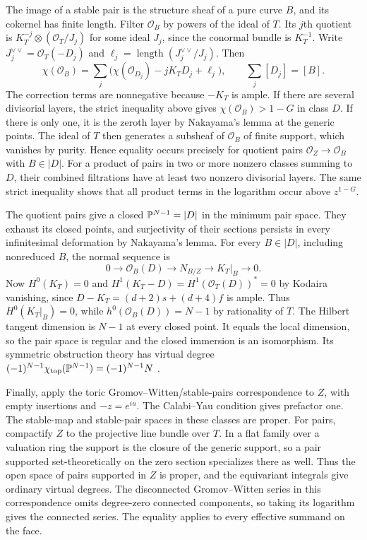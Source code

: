 The image of a stable pair is the structure sheaf of a pure curve $B$,
and its cokernel has finite length. Filter $\mathcal O_B$ by powers of
the ideal of $T$. Its $j$th quotient is
$K_T^{-j}\otimes(\mathcal O_T/J_j)$ for some ideal $J_j$, since the
conormal bundle is $K_T^{-1}$. Write
$J_j^{\vee\vee}=\mathcal O_T(-D_j)$ and
$\ell_j=\operatorname{length}(J_j^{\vee\vee}/J_j)$. Then
\[
 \chi(\mathcal O_B)=
 \sum_j\bigl(\chi(\mathcal O_{D_j})-jK_TD_j+\ell_j\bigr),
 \qquad \sum_j[D_j]=[B].
\]
The correction terms are nonnegative because $-K_T$ is ample. If there
are several divisorial layers, the strict inequality above gives
$\chi(\mathcal O_B)>1-G$ in class $D$. If there is only one, it is the
zeroth layer by Nakayama's lemma at the generic points. The ideal of
$T$ then generates a subsheaf of $\mathcal O_B$ of finite support, which
vanishes by purity. Hence equality occurs precisely for quotient pairs
$\mathcal O_Z\to\mathcal O_B$ with $B\in|D|$. For a product of pairs
in two or more nonzero classes summing to $D$, their combined filtrations
have at least two nonzero divisorial layers. The same strict inequality
shows that all product terms in the logarithm occur above $z^{1-G}$.

The quotient pairs give a closed $\mathbb P^{N-1}=|D|$ in the minimum
pair space. They exhaust its closed points, and surjectivity of their
sections persists in every infinitesimal deformation by Nakayama's lemma.
For every $B\in|D|$, including nonreduced $B$, the normal sequence is
\[
 0\longrightarrow\mathcal O_B(D)\longrightarrow N_{B/Z}
   \longrightarrow K_T|_B\longrightarrow0.
\]
Now $H^0(K_T)=0$ and $H^1(K_T-D)=H^1(\mathcal O_T(D))^*=0$ by Kodaira
vanishing, since $D-K_T=(d+2)s+(d+4)f$ is ample.
Thus $H^0(K_T|_B)=0$, while $h^0(\mathcal O_B(D))=N-1$ by rationality
of $T$. The Hilbert tangent dimension is $N-1$ at every closed point.
It equals the local dimension, so the pair space is regular and the closed
immersion is an isomorphism. Its symmetric obstruction theory has virtual
degree $(-1)^{N-1}\chi_{\rm top}(\mathbb P^{N-1})=(-1)^{N-1}N$
\cite[\S1]{pt}.

Finally, apply the toric Gromov--Witten/stable-pairs correspondence
\cite[Theorem~1]{pp} to $Z$, with empty insertions and $-z=e^{iu}$.
The Calabi--Yau condition gives prefactor one. The stable-map and
stable-pair spaces in these classes are proper. For pairs, compactify $Z$
to the projective line bundle over $T$. In a flat family over a valuation
ring the support is the closure of the generic support, so a pair
supported set-theoretically on the zero section specializes there as well.
Thus the open space of pairs supported in $Z$ is proper, and the
equivariant integrals give ordinary virtual degrees. The disconnected
Gromov--Witten series in this correspondence omits degree-zero connected
components, so taking its logarithm gives the connected series.
The equality applies to every effective summand on the face.

